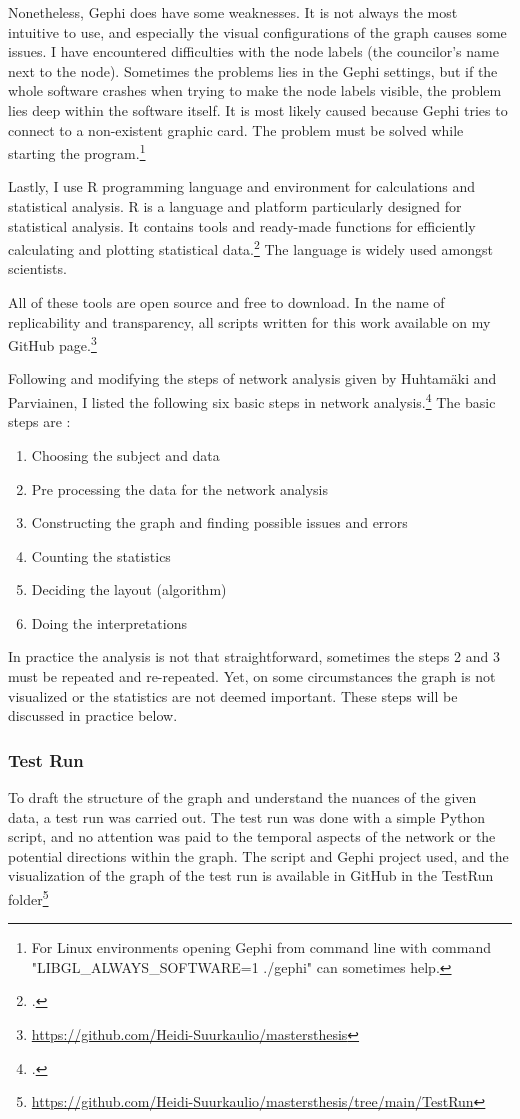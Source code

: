 Nonetheless, Gephi does have some weaknesses. It is not always the most intuitive to use, and especially the visual configurations of the graph causes some issues. I have encountered difficulties with the node labels (the councilor's name next to the node). Sometimes the problems lies in the Gephi settings, but if the whole software crashes when trying to make the node labels visible, the problem lies deep within the software itself. It is most likely caused because Gephi tries to connect to a non-existent graphic card. The problem must be solved while starting the program.\footnote{For Linux environments opening Gephi from command line with command "LIBGL\_ALWAYS\_SOFTWARE=1 ./gephi" can sometimes help.} 

Lastly, I use R programming language and environment for calculations and statistical analysis. R is a language and platform particularly designed for statistical analysis. It contains tools and ready-made functions for efficiently calculating and plotting statistical data.\footcite{R} The language is widely used amongst scientists. 

All of these tools are open source and free to download. In the name of replicability and transparency, all scripts written for this work available on my GitHub page.\footnote{\url{https://github.com/Heidi-Suurkaulio/mastersthesis}}

Following and modifying the steps of network analysis given by Huhtamäki and Parviainen, I listed the following six  basic steps in network analysis.\footcite[p. 258]{huhtamakiEtAl} 
The basic steps are : \begin{enumerate}
	\item Choosing the subject and data
	\item Pre processing the data for the network analysis
	\item Constructing the graph and finding possible issues and errors 
	\item Counting the statistics
	\item Deciding the layout (algorithm)
	\item Doing the interpretations
\end{enumerate}
In practice the analysis is not that straightforward, sometimes the steps 2 and 3 must be repeated and re-repeated. Yet, on some circumstances the graph is not visualized or the statistics are not deemed important. These steps will be discussed in practice below.

\subsubsection{Test Run}
To draft the structure of the graph and understand the nuances of the given data, a test run was carried out. The test run was done with a simple Python script, and no attention was paid to the temporal aspects of the network or the potential directions within the graph. The script and Gephi project used, and the visualization of the graph of the test run is available in GitHub in the TestRun folder\footnote{\url{https://github.com/Heidi-Suurkaulio/mastersthesis/tree/main/TestRun}}


